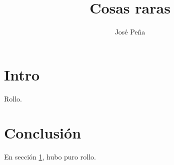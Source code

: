 \documentclass{article}
\title{Cosas raras}
\author{José Peña}
\begin{document}
\maketitle

\section{Intro}\label{intro}

Rollo.

\section{Conclusión}

En sección \ref{intro}, hubo puro rollo.
\end{document}

